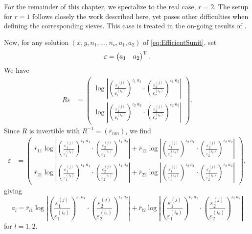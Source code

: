 For the remainder of this chapter, we specialize to the real case, $r = 2$. The setup for $r = 1$ follows closely the work described here, yet poses other difficulties when defining the corresponding sieves. This case is treated in the on-going results of \cite{GhKaMaSi}. 

Now, for any solution $(x,y, n_1, \dots, n_{\nu}, a_1, a_2)$ of \eqref{eq:EfficientSunit}, set
\[\mathbf{\varepsilon} = \begin{pmatrix} a_1 & a_2 \end{pmatrix}^{\text{T}}.\]
We have 
\begin{align*}
R{\varepsilon}
	& = \begin{pmatrix} 
		\log\left|\left(\frac{\varepsilon_1^{(j)}}{\varepsilon_1^{(i_0)}}\right)^{\iota_1 \ a_1} \cdot 
		 \left(\frac{\varepsilon_2^{(j)}}{\varepsilon_2^{(i_0)}}\right)^{\iota_1 \ a_2}\right| \\ 
		\log\left|\left(\frac{\varepsilon_1^{(j)}}{\varepsilon_1^{(i_0)}}\right)^{\iota_2\ a_2} \cdot 
		 \left(\frac{\varepsilon_2^{(j)}}{\varepsilon_2^{(i_0)}}\right)^{\iota_2 \ a_2}\right|
		 \end{pmatrix}.
\end{align*}
Since $R$ is invertible with $R^{-1} = (\overline{r}_{nm})$, we find
\begin{align*}
{\varepsilon} 
	& = \begin{pmatrix} 
		\overline{r}_{11}\log\left|\left(\frac{\varepsilon_1^{(j)}}{\varepsilon_1^{(i_0)}}\right)^{\iota_1 \ a_1} 		\cdot \left(\frac{\varepsilon_2^{(j)}}{\varepsilon_2^{(i_0)}}\right)^{\iota_1 \ a_2}\right| + 
		\overline{r}_{12}\log\left|\left(\frac{\varepsilon_1^{(j)}}{\varepsilon_1^{(i_0)}}\right)^{\iota_2\ a_1}
		\cdot \left(\frac{\varepsilon_2^{(j)}}{\varepsilon_2^{(i_0)}}\right)^{\iota_2 \ a_2}\right| \\
		\overline{r}_{21}\log\left|\left(\frac{\varepsilon_1^{(j)}}{\varepsilon_1^{(i_0)}}\right)^{\iota_1 \ a_1} 		\cdot \left(\frac{\varepsilon_2^{(j)}}{\varepsilon_2^{(i_0)}}\right)^{\iota_1 \ a_2}\right| +
		\overline{r}_{22}\log\left|\left(\frac{\varepsilon_1^{(j)}}{\varepsilon_1^{(i_0)}}\right)^{\iota_2\ a_1}
		\cdot \left(\frac{\varepsilon_2^{(j)}}{\varepsilon_2^{(i_0)}}\right)^{\iota_2 \ a_2}\right|
		\end{pmatrix},
\end{align*}
giving
\[a_l = \overline{r}_{l1}\log\left|\left(\frac{\varepsilon_1^{(j)}}{\varepsilon_1^{(i_0)}}\right)^{\iota_1 \ a_1} 		\cdot \left(\frac{\varepsilon_2^{(j)}}{\varepsilon_2^{(i_0)}}\right)^{\iota_1 \ a_2}\right| + 
	\overline{r}_{l2}\log\left|\left(\frac{\varepsilon_1^{(j)}}{\varepsilon_1^{(i_0)}}\right)^{\iota_2\ a_1}
	\cdot \left(\frac{\varepsilon_2^{(j)}}{\varepsilon_2^{(i_0)}}\right)^{\iota_2 \ a_2}\right|\]
for $l = 1,2$. 

